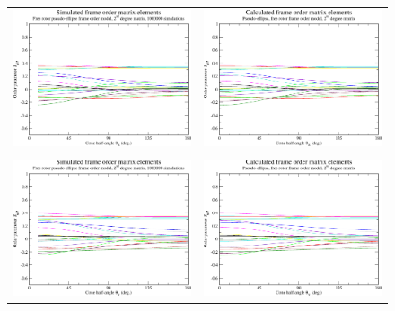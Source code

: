 \begin{figure}
\centering
  \begin{tabular}{@{}cc@{}}
    \includegraphics[width=.5\textwidth]{images/frame_order_matrix/Sijkl_pseudo-ellipse_free_rotor_out_of_frame_theta_x_ens1000000.eps} &
    \includegraphics[width=.5\textwidth]{images/frame_order_matrix/Sijkl_pseudo-ellipse_free_rotor_out_of_frame_theta_x_calc.eps} \\
    \\[-5pt]
    \includegraphics[width=.5\textwidth]{images/frame_order_matrix/Sijkl_pseudo-ellipse_free_rotor_out_of_frame_theta_y_ens1000000.eps} &
    \includegraphics[width=.5\textwidth]{images/frame_order_matrix/Sijkl_pseudo-ellipse_free_rotor_out_of_frame_theta_y_calc.eps} \\

\end{tabular}
\end{figure}
